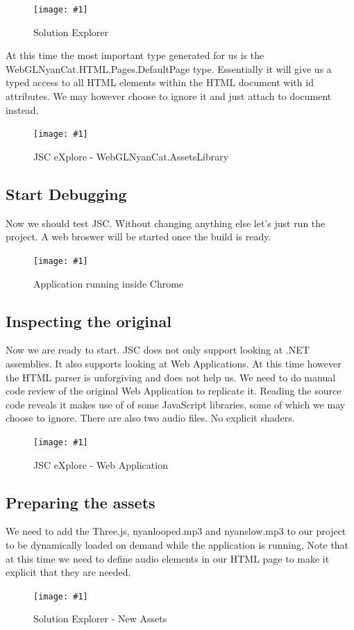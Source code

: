 \documentclass[12pt,leqno]{book}
\newcommand{\png}[1]{\texttt{[image: \#1]}}
\newcommand{\figpng}[2]{\begin{figure}[htb]\centering\png{#1}\caption{#2}\end{figure}}
\begin{document}
\figpng{Images/WebGLNyanCat_-_Microsoft_Visual_Web_Developer_2010_Express-2012-03-31_12.37.24}
{Solution Explorer}

At this time the most important type generated for us is the WebGLNyanCat.HTML.Pages.DefaultPage type. Essentially it will give us a typed access to all HTML elements within the HTML document with id attributes. We may however choose to ignore it and just attach to document instead.

\figpng{Images/eXplore-2012-03-31_12.41.39}
{JSC eXplore - WebGLNyanCat.AssetsLibrary}


\subsection{Start Debugging}
Now we should test JSC. Without changing anything else let's just run the project. A web broswer will be started once the build is ready.



\figpng{Images/A_string_from_JavaScript._-_Google_Chrome-2012-03-31_13.00.11}
{Application running inside Chrome}


\subsection{Inspecting the original}
Now we are ready to start. JSC does not only support looking at .NET assemblies. It also supports looking at Web Applications. At this time however the HTML parser is unforgiving and does not help us. We need to do manual code review of the original Web Application to replicate it. Reading the source code reveals it makes use of of some JavaScript libraries, some of which we may choose to ignore. There are also two audio files. No explicit shaders.

\figpng{Images/eXplore-2012-03-31_13.12.27}
{JSC eXplore - Web Application}


\subsection{Preparing the assets}
We need to add the Three.js, nyanlooped.mp3 and nyanslow.mp3 to our project to be dynamically loaded on demand while the application is running. Note that at this time we need to define audio elements in our HTML page to make it explicit that they are needed.

\figpng{Images/WebGLNyanCat_-_Microsoft_Visual_Web_Developer_2010_Express-2012-03-31_13.24.27}
{Solution Explorer - New Assets}
\end{document}
